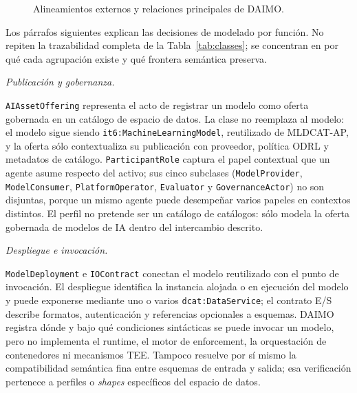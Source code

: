 \documentclass[Afour,sagev,times]{sagej}
\newcommand{\code}[1]{\texttt{#1}}
\begin{document}
\begin{figure}[tbp]
{
}
\caption{Alineamientos externos y relaciones principales de DAIMO.}
\label{fig:classes}
\end{figure}

Los párrafos siguientes explican las decisiones de modelado por función. No repiten la trazabilidad completa de la Tabla~\ref{tab:classes}; se concentran en por qué cada agrupación existe y qué frontera semántica preserva.

\medskip\noindent\emph{Publicación y gobernanza.}\par\nobreak\noindent
\code{AIAssetOffering} representa el acto de registrar un modelo como oferta gobernada en un catálogo de espacio de datos. La clase no reemplaza al modelo: el modelo sigue siendo \code{it6:MachineLearningModel}, reutilizado de MLDCAT-AP, y la oferta sólo contextualiza su publicación con proveedor, política ODRL y metadatos de catálogo. \code{ParticipantRole} captura el papel contextual que un agente asume respecto del activo; sus cinco subclases (\code{ModelProvider}, \code{ModelConsumer}, \code{PlatformOperator}, \code{Evaluator} y \code{GovernanceActor}) no son disjuntas, porque un mismo agente puede desempeñar varios papeles en contextos distintos. El perfil no pretende ser un catálogo de catálogos: sólo modela la oferta gobernada de modelos de IA dentro del intercambio descrito.

\medskip\noindent\emph{Despliegue e invocación.}\par\nobreak\noindent
\code{ModelDeployment} e \code{IOContract} conectan el modelo reutilizado con el punto de invocación. El despliegue identifica la instancia alojada o en ejecución del modelo y puede exponerse mediante uno o varios \code{dcat:DataService}; el contrato E/S describe formatos, autenticación y referencias opcionales a esquemas. DAIMO registra dónde y bajo qué condiciones sintácticas se puede invocar un modelo, pero no implementa el runtime, el motor de enforcement, la orquestación de contenedores ni mecanismos TEE. Tampoco resuelve por sí mismo la compatibilidad semántica fina entre esquemas de entrada y salida; esa verificación pertenece a perfiles o \emph{shapes} específicos del espacio de datos.
\end{document}

